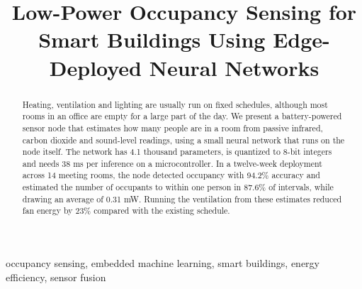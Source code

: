 \documentclass[conference]{IEEEtran}
\begin{document}
\title{Low-Power Occupancy Sensing for Smart Buildings Using Edge-Deployed Neural Networks}

\author{
\and
{}
\and
{}
}

\maketitle

\begin{abstract}
Heating, ventilation and lighting are usually run on fixed schedules, although most rooms in an office are empty for a large part of the day. We present a battery-powered sensor node that estimates how many people are in a room from passive infrared, carbon dioxide and sound-level readings, using a small neural network that runs on the node itself. The network has 4.1 thousand parameters, is quantized to 8-bit integers and needs 38 ms per inference on a microcontroller. In a twelve-week deployment across 14 meeting rooms, the node detected occupancy with 94.2\% accuracy and estimated the number of occupants to within one person in 87.6\% of intervals, while drawing an average of 0.31 mW. Running the ventilation from these estimates reduced fan energy by 23\% compared with the existing schedule.
\end{abstract}

\begin{IEEEkeywords}
occupancy sensing, embedded machine learning, smart buildings, energy efficiency, sensor fusion
\end{IEEEkeywords}
\end{document}
